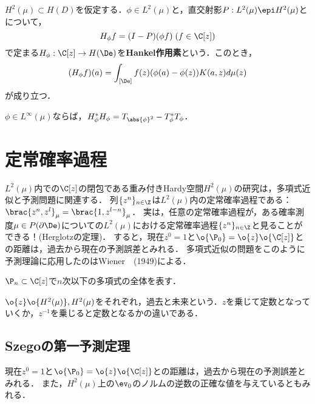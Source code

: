 \documentclass[uplatex,dvipdfmx]{jsreport}
\begin{document}
\begin{definition}
    $H^2(\mu)\subset H(D)$を仮定する．$\phi\in L^2(\mu)$と，直交射影$P:L^2(\mu)\epi H^2(\mu)$とについて，
    \[H_\phi f=(I-P)(\phi f)\;(f\in\C[z])\]
    で定まる$H_\phi:\C[z]\to H(\De)$を\textbf{Hankel作用素}という．このとき，
    \[(H_\phi f)(a)=\int_{[\De]}f(z)(\phi(a)-\phi(z))K(a,z)d\mu(z)\]
    が成り立つ．
\end{definition}

\begin{proposition}
    $\phi\in L^\infty(\mu)$ならば，$H^*_\phi H_\phi=T_{\abs{\phi}^2}-T^*_\phi T_\phi$．
\end{proposition}

\section{定常確率過程}

\begin{tcolorbox}[colframe=ForestGreen, colback=ForestGreen!10!white,breakable,colbacktitle=ForestGreen!40!white,coltitle=black,fonttitle=\bfseries\sffamily,
title=]
    $L^2(\mu)$内での$\C[z]$の閉包である重み付きHardy空間$H^2(\mu)$の研究は，多項式近似と予測問題に関連する．
    列$\{z^n\}_{n\in\Z}$は$L^2(\mu)$内の定常確率過程である：$\brac{z^n,z^l}_\mu=\brac{1,z^{l-n}}_\mu$．
    実は，任意の定常確率過程が，ある確率測度$\mu\in P(\partial\De)$についての$L^2(\mu)$における定常確率過程$\{z^n\}_{n\in\Z}$と見ることができる！(Herglotzの定理)．
    すると，現在$z^0=1$と$\o{\P_0}=\o{z}\o{\C[z]}$との距離は，過去から現在の予測誤差とみれる．
    多項式近似の問題をこのように予測理論に応用したのはWiener　(1949)による．
\end{tcolorbox}

\begin{notation}
    $\P_n\subset\C[z]$で$n$次以下の多項式の全体を表す．
\end{notation}

\begin{definition}
    $\o{z}\o{H^2(\mu)},H^2(\mu)$をそれぞれ，過去と未来という．$z$を乗じて定数となっていくか，$z^{-1}$を乗じると定数となるかの違いである．
\end{definition}

\subsection{Szegoの第一予測定理}

\begin{tcolorbox}[colframe=ForestGreen, colback=ForestGreen!10!white,breakable,colbacktitle=ForestGreen!40!white,coltitle=black,fonttitle=\bfseries\sffamily,
title=]
    現在$z^0=1$と$\o{\P_0}=\o{z}\o{\C[z]}$との距離は，過去から現在の予測誤差とみれる．
    また，$H^2(\mu)$上の$\ev_0$のノルムの逆数の正確な値を与えているともみれる．
\end{tcolorbox}
\end{document}
